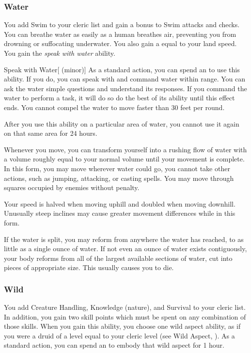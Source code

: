         \subsubsection{Water}
             You add Swim to your cleric  list and gain a  bonus to Swim attacks and checks.
             You can breathe water as easily as a human breathes air, preventing you from drowning or suffocating underwater.
            You also gain a  equal to your land speed.
             You gain the \textit{speak with water} ability.
            \begin{ability}{Speak with Water}[ (minor)]
                As a standard action, you can spend an  to use this ability.
                If you do, you can speak with and command water within range.
                You can ask the water simple questions and understand its responses.
                If you command the water to perform a task, it will do so do the best of its ability until this effect ends.
                You cannot compel the water to move faster than 30 feet per round.

                After you use this ability on a particular area of water, you cannot use it again on that same area for 24 hours.
            \end{ability}
            Whenever you move, you can transform yourself into a rushing flow of water with a volume roughly equal to your normal volume until your movement is complete.
            In this form, you may move wherever water could go, you cannot take other actions, such as jumping, attacking, or casting spells.
            You may move through squares occupied by enemies without penalty.
            \par Your speed is halved when moving uphill and doubled when moving downhill.
            Unusually steep inclines may cause greater movement differences while in this form.
            \par If the water is split, you may reform from anywhere the water has reached, to as little as a single ounce of water.
            If not even an ounce of water exists contiguously, your body reforms from all of the largest available sections of water, cut into pieces of appropriate size.
            This usually causes you to die.

        \subsubsection{Wild}
             You add Creature Handling, Knowledge (nature), and Survival to your cleric  list.
            In addition, you gain two skill points which must be spent on any combination of those skills.
             When you gain this ability, you choose one wild aspect ability, as if you were a druid of a level equal to your cleric level (see Wild Aspect, ).
            As a standard action, you can spend an  to embody that wild aspect for 1 hour.

